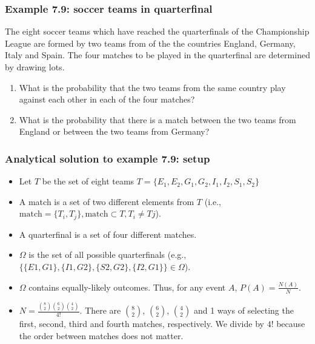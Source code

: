 \begin{frame}[fragile]
    \frametitle{Example 7.9: soccer teams in quarterfinal}

    \begin{manualProbExample}{7.9}
        The eight soccer teams which have reached the quarterfinals of the
        Championship League are formed by two teams from of the the countries
        England, Germany, Italy and Spain. The four matches to be played in the
        quarterfinal are determined by drawing lots.

        \begin{enumerate}[a]
            \item What is the probability that the two teams from the same
                country play against each other in each of the four matches?
            \item What is the probability that there is a match between the two
                teams from England or between the two teams from Germany?
        \end{enumerate}
    \end{manualProbExample}

\end{frame}

\begin{frame}
    \frametitle{Analytical solution to example 7.9: setup}
    \begin{itemize}[<+->]
        \item Let $T$ be the set of eight teams
            $T=\{E_1,E_2,G_1,G_2,I_1,I_2,S_1,S_2\}$
        \item A match is a set of two different elements from $T$ (i.e.,
            $\text{match}=\{T_i,T_j\},\text{match}\subset T,T_i\neq Tj$).
        \item A quarterfinal is a set of four different matches.
        \item $\Omega$ is the set of all possible quarterfinals (e.g.,
            $\{\{E1,G1\},\{I1,G2\},\{S2,G2\},\{I2,G1\}\}\in\Omega$).
        \item $\Omega$ contains equally-likely outcomes. Thus, for any event
            $A$, $P(A)=\frac{N(A)}{N}$.

        \item $N=\frac{\binom{8}{2}\binom{6}{2}\binom{4}{2}}{4!}$. There are
            $\binom{8}{2}$, $\binom{6}{2}$, $\binom{4}{2}$ and 1  ways of
            selecting the first, second, third and fourth matches,
            respectively. We divide by $4!$ because the order between matches
            does not matter.

    \end{itemize}
\end{frame}

